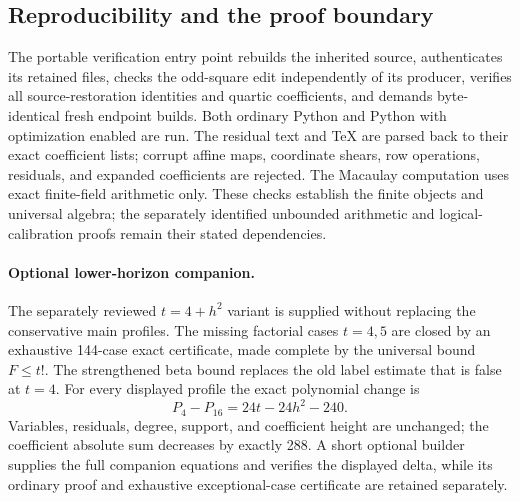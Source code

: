 \subsection{Reproducibility and the proof boundary}
The portable verification entry point rebuilds the inherited source,
authenticates its retained files, checks the odd-square edit independently
of its producer, verifies all source-restoration identities and quartic
coefficients, and demands byte-identical fresh endpoint builds.
Both ordinary Python and Python with optimization enabled are run.
The residual text and TeX are parsed back to their exact coefficient lists;
corrupt affine maps, coordinate shears, row operations, residuals, and
expanded coefficients are rejected.  The Macaulay computation uses exact
finite-field arithmetic only.  These checks establish the finite objects
and universal algebra; the separately identified unbounded arithmetic and
logical-calibration proofs remain their stated dependencies.

\paragraph{Optional lower-horizon companion.}
The separately reviewed $t=4+h^2$ variant is supplied without replacing
the conservative main profiles.  The missing factorial cases $t=4,5$ are
closed by an exhaustive 144-case exact certificate, made complete by the
universal bound $F\le t!$.  The strengthened beta bound replaces the old
label estimate that is false at $t=4$.  For every displayed profile the
exact polynomial change is
\[
 P_4-P_{16}=24t-24h^2-240.
\]
Variables, residuals, degree, support, and coefficient height are unchanged;
the coefficient absolute sum decreases by exactly 288.  A short optional
builder supplies the full companion equations and verifies the displayed
delta, while its ordinary proof and exhaustive exceptional-case certificate
are retained separately.
